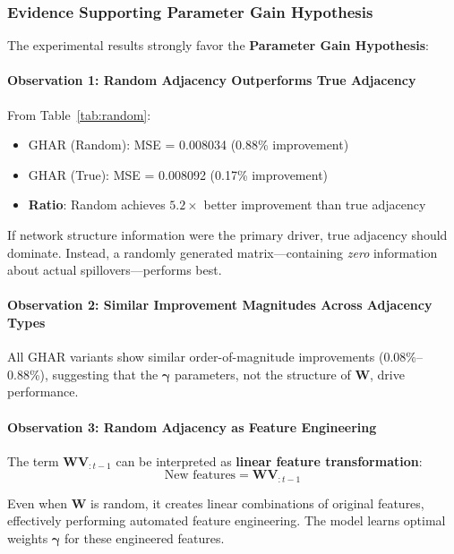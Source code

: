 \documentclass[10pt,a4paper]{article}
\begin{document}
\subsubsection{Evidence Supporting Parameter Gain Hypothesis}

The experimental results strongly favor the \textbf{Parameter Gain Hypothesis}:

\paragraph{Observation 1: Random Adjacency Outperforms True Adjacency}

From Table~\ref{tab:random}:
\begin{itemize}
\item GHAR (Random): MSE = 0.008034 (0.88\% improvement)
\item GHAR (True): MSE = 0.008092 (0.17\% improvement)
\item \textbf{Ratio}: Random achieves $5.2\times$ better improvement than true adjacency
\end{itemize}

If network structure information were the primary driver, true adjacency should dominate. Instead, a randomly generated matrix---containing \textit{zero} information about actual spillovers---performs best.

\paragraph{Observation 2: Similar Improvement Magnitudes Across Adjacency Types}

All GHAR variants show similar order-of-magnitude improvements (0.08\%--0.88\%), suggesting that the $\boldsymbol{\gamma}$ parameters, not the structure of $\mathbf{W}$, drive performance.

\paragraph{Observation 3: Random Adjacency as Feature Engineering}

The term $\mathbf{W} \mathbf{V}_{:t-1}$ can be interpreted as \textbf{linear feature transformation}:
\begin{equation}
\text{New features} = \mathbf{W} \mathbf{V}_{:t-1}
\end{equation}

Even when $\mathbf{W}$ is random, it creates linear combinations of original features, effectively performing automated feature engineering. The model learns optimal weights $\boldsymbol{\gamma}$ for these engineered features.
\end{document}
